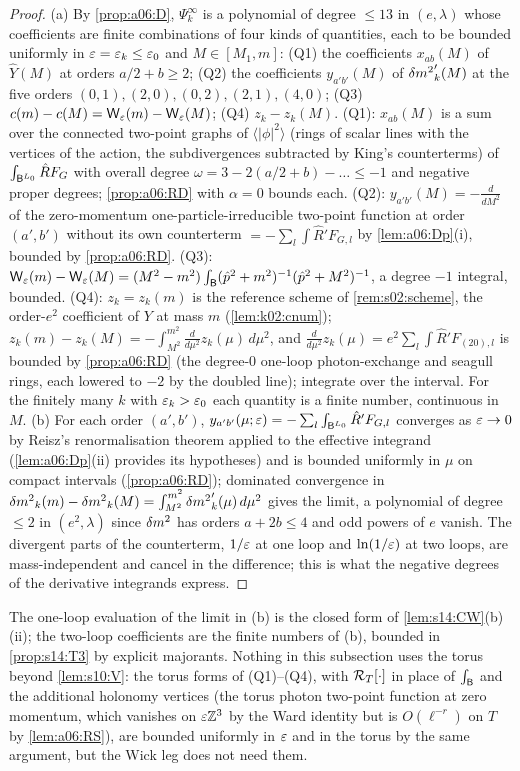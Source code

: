\begin{proof}
(a) By \cref{prop:a06:D}, $\Psi^\infty_k$ is a polynomial of degree $\le13$ in $(e,\lambda)$ whose coefficients are finite combinations of four kinds of quantities, each to be bounded uniformly in $\varepsilon=\varepsilon_k\le\varepsilon_0$ and $M\in[M_1,m]$: (Q1) the coefficients $x_{ab}(M)$ of $\hat Y(M)$ at orders $a/2+b\ge2$; (Q2) the coefficients $y_{a'b'}(M)$ of ${\delta m^2}_k'(M)$ at the five orders $(0,1),(2,0),(0,2),(2,1),(4,0)$; (Q3) $c(m)-c(M)=\mathsf W_{\varepsilon}(m)-\mathsf W_{\varepsilon}(M)$; (Q4) $z_k-z_k(M)$. (Q1): $x_{ab}(M)$ is a sum over the connected two-point graphs of $\langle|\phi|^2\rangle$ (rings of scalar lines with the vertices of the action, the subdivergences subtracted by King's counterterms) of $\int_{\mathsf B^{L_0}}\hat RF_G$ with overall degree $\omega=3-2(a/2+b)-\ldots\le-1$ and negative proper degrees; \cref{prop:a06:RD} with $\alpha=0$ bounds each. (Q2): $y_{a'b'}(M)=-\frac{d}{dM^2}$ of the zero-momentum one-particle-irreducible two-point function at order $(a',b')$ without its own counterterm $=-\sum_l\int\hat R'F_{G,l}$ by \cref{lem:a06:Dp}(i), bounded by \cref{prop:a06:RD}. (Q3): $\mathsf W_{\varepsilon}(m)-\mathsf W_{\varepsilon}(M)=(M^2-m^2)\int_{\mathsf B}(\hat p^2+m^2)^{-1}(\hat p^2+M^2)^{-1}$, a degree $-1$ integral, bounded. (Q4): $z_k=z_k(m)$ is the reference scheme of \cref{rem:s02:scheme}, the order-$e^2$ coefficient of $Y$ at mass $m$ (\cref{lem:k02:cnum}); $z_k(m)-z_k(M)=-\int_{M^2}^{m^2}\frac{d}{d\mu^2}z_k(\mu)\,d\mu^2$, and $\frac{d}{d\mu^2}z_k(\mu)=e^2\sum_l\int\hat R'F_{(20),l}$ is bounded by \cref{prop:a06:RD} (the degree-$0$ one-loop photon-exchange and seagull rings, each lowered to $-2$ by the doubled line); integrate over the interval. For the finitely many $k$ with $\varepsilon_k>\varepsilon_0$ each quantity is a finite number, continuous in $M$. (b) For each order $(a',b')$, $y_{a'b'}(\mu;\varepsilon)=-\sum_l\int_{\mathsf B^{L_0}}\hat R'F_{G,l}$ converges as $\varepsilon\to0$ by Reisz's renormalisation theorem applied to the effective integrand (\cref{lem:a06:Dp}(ii) provides its hypotheses) and is bounded uniformly in $\mu$ on compact intervals (\cref{prop:a06:RD}); dominated convergence in ${\delta m^2}_k(m)-{\delta m^2}_k(M)=\int_{M^2}^{m^2}{\delta m^2}_k'(\mu)\,d\mu^2$ gives the limit, a polynomial of degree $\le2$ in $(e^2,\lambda)$ since ${\delta m^2}$ has orders $a+2b\le4$ and odd powers of $e$ vanish. The divergent parts of the counterterm, $1/\varepsilon$ at one loop and $\ln(1/\varepsilon)$ at two loops, are mass-independent and cancel in the difference; this is what the negative degrees of the derivative integrands express.
\end{proof}

The one-loop evaluation of the limit in (b) is the closed form of \cref{lem:s14:CW}(b)(ii); the two-loop coefficients are the finite numbers of (b), bounded in \cref{prop:s14:T3} by explicit majorants. Nothing in this subsection uses the torus beyond \cref{lem:s10:V}: the torus forms of (Q1)--(Q4), with $\mathcal R_{T}[\cdot]$ in place of $\int_{\mathsf B}$ and the additional holonomy vertices (the torus photon two-point function at zero momentum, which vanishes on $\varepsilon\mathbb Z^3$ by the Ward identity but is $O(\ell^{-r})$ on $T$ by \cref{lem:a06:RS}), are bounded uniformly in $\varepsilon$ and in the torus by the same argument, but the Wick leg does not need them.
